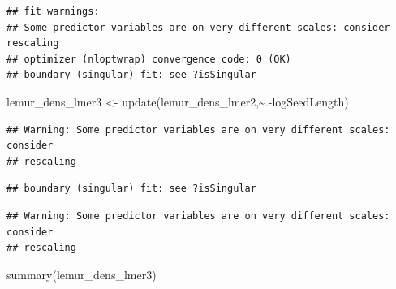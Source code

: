\documentclass[
  12pt,
]{article}
\newenvironment{Shaded}{\begin{snugshade}}{\end{snugshade}}
\newcommand{\FunctionTok}[1]{\textcolor[rgb]{0.00,0.00,0.00}{#1}}
\newcommand{\NormalTok}[1]{#1}
\newcommand{\OtherTok}[1]{\textcolor[rgb]{0.56,0.35,0.01}{#1}}
\newcommand{\SpecialCharTok}[1]{\textcolor[rgb]{0.00,0.00,0.00}{#1}}
\begin{document}
\begin{verbatim}
## fit warnings:
## Some predictor variables are on very different scales: consider rescaling
## optimizer (nloptwrap) convergence code: 0 (OK)
## boundary (singular) fit: see ?isSingular
\end{verbatim}

\begin{Shaded}
\begin{Highlighting}[]
\NormalTok{lemur\_dens\_lmer3 }\OtherTok{\textless{}{-}} \FunctionTok{update}\NormalTok{(lemur\_dens\_lmer2,}\SpecialCharTok{\textasciitilde{}}\NormalTok{.}\SpecialCharTok{{-}}\NormalTok{logSeedLength)}
\end{Highlighting}
\end{Shaded}

\begin{verbatim}
## Warning: Some predictor variables are on very different scales: consider
## rescaling
\end{verbatim}

\begin{verbatim}
## boundary (singular) fit: see ?isSingular
\end{verbatim}

\begin{verbatim}
## Warning: Some predictor variables are on very different scales: consider
## rescaling
\end{verbatim}

\begin{Shaded}
\begin{Highlighting}[]
\FunctionTok{summary}\NormalTok{(lemur\_dens\_lmer3)}
\end{Highlighting}
\end{Shaded}
\end{document}

